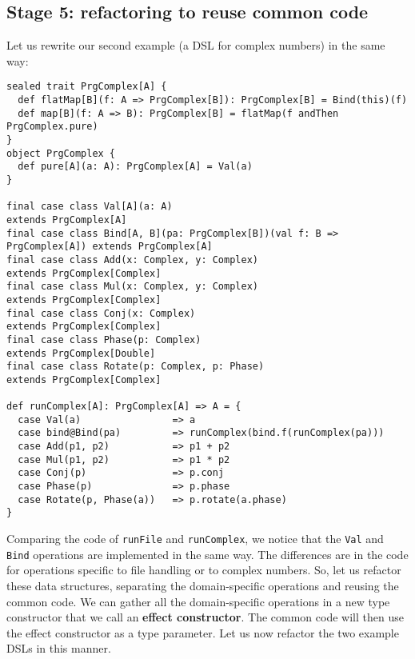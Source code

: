 \subsection{Stage 5: refactoring to reuse common code\label{subsec:Stage-5:-refactoring-monadDSL}}

Let us rewrite our second example (a DSL for complex numbers) in the
same way:
\begin{lstlisting}
sealed trait PrgComplex[A] {
  def flatMap[B](f: A => PrgComplex[B]): PrgComplex[B] = Bind(this)(f)
  def map[B](f: A => B): PrgComplex[B] = flatMap(f andThen PrgComplex.pure)
}
object PrgComplex {
  def pure[A](a: A): PrgComplex[A] = Val(a)
}

final case class Val[A](a: A)                                             extends PrgComplex[A]
final case class Bind[A, B](pa: PrgComplex[B])(val f: B => PrgComplex[A]) extends PrgComplex[A]
final case class Add(x: Complex, y: Complex)                              extends PrgComplex[Complex]
final case class Mul(x: Complex, y: Complex)                              extends PrgComplex[Complex]
final case class Conj(x: Complex)                                         extends PrgComplex[Complex]
final case class Phase(p: Complex)                                        extends PrgComplex[Double]
final case class Rotate(p: Complex, p: Phase)                             extends PrgComplex[Complex]

def runComplex[A]: PrgComplex[A] => A = {
  case Val(a)                => a
  case bind@Bind(pa)         => runComplex(bind.f(runComplex(pa)))
  case Add(p1, p2)           => p1 + p2
  case Mul(p1, p2)           => p1 * p2
  case Conj(p)               => p.conj
  case Phase(p)              => p.phase
  case Rotate(p, Phase(a))   => p.rotate(a.phase)
}
\end{lstlisting}
Comparing the code of \lstinline!runFile!
and \lstinline!runComplex!,
we notice that the \lstinline!Val!
and \lstinline!Bind! operations
are implemented in the same way. The differences are in the code for
operations specific to file handling or to complex numbers. So, let
us refactor these data structures, separating the domain-specific
operations and reusing the common code. We can gather all the domain-specific
operations in a new type constructor that we call an \textbf{effect
constructor}. The common code will then use the effect constructor
as a type parameter. Let us now refactor the two example DSLs in this
manner.

